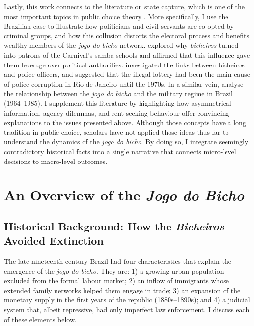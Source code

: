 \documentclass[a4paper,12pt]{article}
\begin{document}
Lastly, this work connects to the literature on state capture, which is one of the most important topics in public choice theory \citep{rose1978corruption,shleifer2002grabbing,tollison1982rent}. More specifically, I use the Brazilian case to illustrate how politicians and civil servants are co-opted by criminal groups, and how this collusion distorts the electoral process and benefits wealthy members of the \textit{jogo do bicho} network. \citet{queiroz1992carnaval} explored why \textit{bicheiros} turned into patrons of the Carnival's samba schools and affirmed that this influence gave them leverage over political authorities. \citet{misse2007illegal} investigated the links between bicheiros and police officers, and suggested that the illegal lottery had been the main cause of police corruption in Rio de Janeiro until the 1970s. In a similar vein, \citet{jupiara2015poroes} analyse the relationship between the \textit{jogo do bicho} and the military regime in Brazil (1964--1985). I supplement this literature by highlighting how asymmetrical information, agency dilemmas, and rent-seeking behaviour offer convincing explanations to the issues presented above. Although those concepts have a long tradition in public choice, scholars have not applied those ideas thus far to understand the dynamics of the \textit{jogo do bicho}. By doing so, I integrate seemingly contradictory historical facts into a single narrative that connects micro-level decisions to macro-level outcomes. 

\section{An Overview of the \textit{Jogo do Bicho}}%
\label{sec:overview}

\subsection{Historical Background: How the \textit{Bicheiros} Avoided Extinction}%
\label{sub:historical_background}

The late nineteenth-century Brazil had four characteristics that explain the emergence of the \textit{jogo do bicho}. They are: 1) a growing urban population excluded from the formal labour market; 2) an inflow of immigrants whose extended family networks helped them engage in trade; 3) an expansion of the monetary supply in the first years of the republic (1880s--1890s); and 4) a judicial system that, albeit repressive, had only imperfect law enforcement. I discuss each of these elements below.
\end{document}
